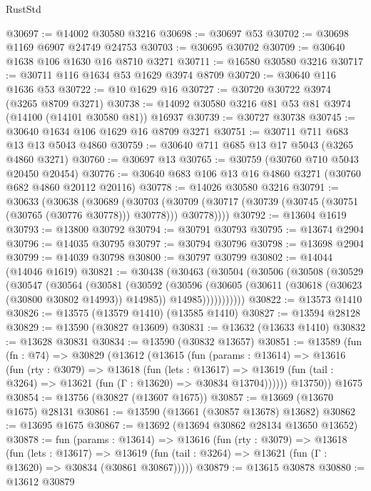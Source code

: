 \begin{lexlean}{RustStd}
\begin{coremodule}
@30697 := @14002 @30580 @3216
@30698 := @30697 @53
@30702 := @30698 @1169 @6907 @24749 @24753
@30703 := @30695 @30702
@30709 := @30640 @1638 @106 @1630 @16 @8710 @3271
@30711 := @16580 @30580 @3216
@30717 := @30711 @116 @1634 @53 @1629 @3974 @8709
@30720 := @30640 @116 @1636 @53
@30722 := @10 @1629 @16
@30727 := @30720 @30722 @3974 (@3265 @8709 @3271)
@30738 := @14092 @30580 @3216 @81 @53 @81 @3974 (@14100 (@14101 @30580 @81)) @16937
@30739 := @30727 @30738
@30745 := @30640 @1634 @106 @1629 @16 @8709 @3271
@30751 := @30711 @711 @683 @13 @13 @5043 @4860
@30759 := @30640 @711 @685 @13 @17 @5043 (@3265 @4860 @3271)
@30760 := @30697 @13
@30765 := @30759 (@30760 @710 @5043 @20450 @20454)
@30776 := @30640 @683 @106 @13 @16 @4860 @3271 (@30760 @682 @4860 @20112 @20116)
@30778 := @14026 @30580 @3216
@30791 := @30633
    (@30638
      (@30689
        (@30703
          (@30709 (@30717 (@30739 (@30745 (@30751 (@30765 (@30776 @30778))) @30778))) @30778))))
@30792 := @13604 @1619
@30793 := @13800 @30792
@30794 := @30791 @30793
@30795 := @13674 @2904
@30796 := @14035 @30795
@30797 := @30794 @30796
@30798 := @13698 @2904
@30799 := @14039 @30798
@30800 := @30797 @30799
@30802 := @14044 (@14046 @1619)
@30821 := @30438
    (@30463
      (@30504
        (@30506
          (@30508
            (@30529
              (@30547
                (@30564
                  (@30581
                    (@30592
                      (@30596
                        (@30605
                          (@30611 (@30618 (@30623 (@30800 @30802 @14993)) @14985))
                          @14985)))))))))))
@30822 := @13573 @1410
@30826 := @13575 (@13579 @1410) (@13585 @1410)
@30827 := @13594 @28128
@30829 := @13590 (@30827 @13609)
@30831 := @13632 (@13633 @1410)
@30832 := @13628 @30831
@30834 := @13590 (@30832 @13657)
@30851 := @13589
    (fun (fn : @74) =>
    @30829
      (@13612
        (@13615
          (fun (params : @13614) =>
          @13616
            (fun (rty : @3079) =>
            @13618
              (fun (lets : @13617) =>
              @13619 (fun (tail : @3264) => @13621 (fun (Γ : @13620) => @30834 @13704))))))
        @13750))
    @1675
@30854 := @13756 (@30827 (@13607 @1675))
@30857 := @13669 (@13670 @1675) @28131
@30861 := @13590 (@13661 (@30857 @13678) @13682)
@30862 := @13695 @1675
@30867 := @13692 (@13694 @30862 @28134 @13650 @13652)
@30878 := fun (params : @13614) =>
  @13616
    (fun (rty : @3079) =>
    @13618
      (fun (lets : @13617) =>
      @13619 (fun (tail : @3264) => @13621 (fun (Γ : @13620) => @30834 (@30861 @30867)))))
@30879 := @13615 @30878
@30880 := @13612 @30879

\end{coremodule}
\end{lexlean}
